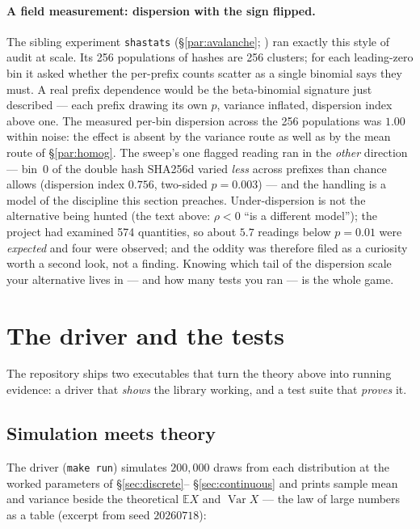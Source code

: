 \documentclass[11pt]{article}
\numberwithin{equation}{section}
\newcommand{\srcref}[1]{%
  \par\smallskip\noindent{\small\sffamily\color{inkS}\raggedright
  $\hookrightarrow$ implemented in \texttt{#1}\par}\smallskip}
\newcommand{\E}{\mathbb{E}}
\newcommand{\Var}{\operatorname{Var}}
\begin{document}
\paragraph{A field measurement: dispersion with the sign flipped.}
\label{par:underdisp}
The sibling experiment \texttt{shastats} (\S\ref{par:avalanche};
\citealp{shastats2026}) ran exactly this style of audit at scale.  Its
256 populations of hashes are 256 clusters; for each leading-zero bin it
asked whether the per-prefix counts scatter as a single binomial says
they must.  A real prefix dependence would be the beta-binomial
signature just described --- each prefix drawing its own $p$, variance
inflated, dispersion index above one.  The measured per-bin dispersion
across the 256 populations was $1.00$ within noise: the effect is absent
by the variance route as well as by the mean route of
\S\ref{par:homog}.  The sweep's one flagged reading ran in the
\emph{other} direction --- bin~0 of the double hash SHA256d varied
\emph{less} across prefixes than chance allows (dispersion index
$0.756$, two-sided $p=0.003$) --- and the handling is a model of the
discipline this section preaches.  Under-dispersion is not the
alternative being hunted (the text above: $\rho<0$ ``is a different
model''); the project had examined 574 quantities, so about $5.7$
readings below $p=0.01$ were \emph{expected} and four were observed;
and the oddity was therefore filed as a curiosity worth a second look,
not a finding.  Knowing which tail of the dispersion scale your
alternative lives in --- and how many tests you ran --- is the whole
game.

\srcref{src/stats.c: ps\_tarone\_z()}

\section{The driver and the tests}\label{sec:driver}

The repository ships two executables that turn the theory above into
running evidence: a driver that \emph{shows} the library working, and a
test suite that \emph{proves} it.

\subsection{Simulation meets theory}\label{sec:moments}

The driver (\texttt{make run}) simulates $200{,}000$ draws from each
distribution at the worked parameters of \S\ref{sec:discrete}--%
\S\ref{sec:continuous} and prints sample mean and variance beside the
theoretical $\E X$ and $\Var X$ --- the law of large numbers as a table
(excerpt from seed $20260718$):
\end{document}
